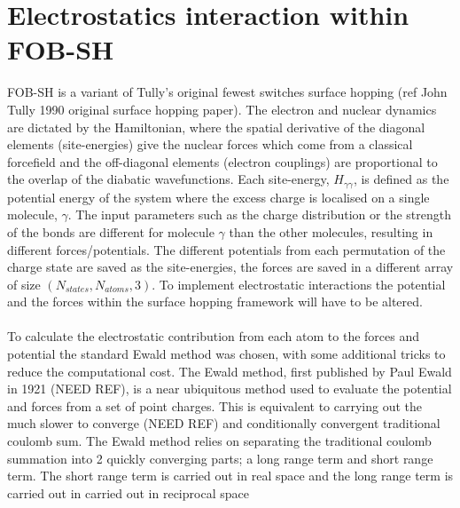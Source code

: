\section{Electrostatics interaction within FOB-SH}
FOB-SH is a variant of Tully's original fewest switches surface hopping \cite{} (ref John Tully 1990 original surface hopping paper). The electron and nuclear dynamics are dictated by the Hamiltonian, where the spatial derivative of the diagonal elements (site-energies) give the nuclear forces which come from a classical forcefield and the off-diagonal elements (electron couplings) are proportional to the overlap of the diabatic wavefunctions. Each site-energy, $H_{\gamma \gamma}$, is defined as the potential energy of the system where the excess charge is localised on a single molecule, $\gamma$. The input parameters such as the charge distribution or the strength of the bonds are different for molecule $\gamma$ than the other molecules, resulting in different forces/potentials. The different potentials from each permutation of the charge state are saved as the site-energies, the forces are saved in a different array of size $(N_{states}, N_{atoms}, 3)$. To implement electrostatic interactions the potential and the forces within the surface hopping framework will have to be altered.
\\\\
To calculate the electrostatic contribution from each atom to the forces and potential the standard Ewald method was chosen, with some additional tricks to reduce the computational cost. The Ewald method, first published by Paul Ewald in 1921 (NEED REF), is a near ubiquitous method used to evaluate the potential and forces from a set of point charges. This is equivalent to carrying out the much slower to converge (NEED REF) and conditionally convergent traditional coulomb sum. The Ewald method relies on separating the traditional coulomb summation into 2 quickly converging parts; a long range term and short range term. The short range term is carried out in real space and the long range term is carried out in carried out in reciprocal space
